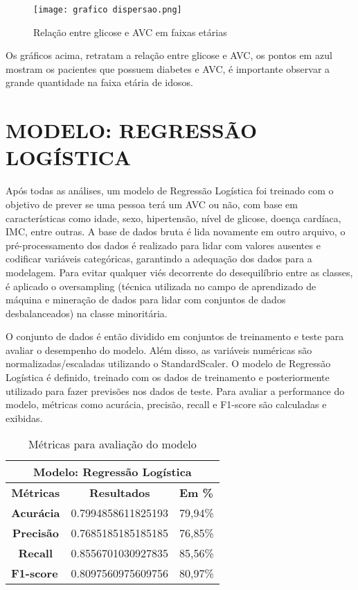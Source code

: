 \documentclass[conference]{IEEEtran}
\begin{document}
\begin{figure}[H]
   \caption{Relação entre glicose e AVC em faixas etárias}
   \centering
   \texttt{[image: grafico dispersao.png]}
\end{figure}

Os gráficos acima, retratam a relação entre glicose e AVC, os pontos em azul mostram os pacientes que possuem diabetes e AVC, é importante observar a grande quantidade na faixa etária de idosos. \\

\section*{MODELO: REGRESSÃO LOGÍSTICA}

Após todas as análises, um modelo de Regressão Logística foi treinado com o objetivo de prever se uma pessoa terá um AVC ou não, com base em características como idade, sexo, hipertensão, nível de glicose, doença cardíaca, IMC, entre outras. A base de dados bruta é lida novamente em outro arquivo, o pré-processamento dos dados é realizado para lidar com valores ausentes e codificar variáveis categóricas, garantindo a adequação dos dados para a modelagem. Para evitar qualquer viés decorrente do desequilíbrio entre as classes, é aplicado o oversampling (técnica utilizada no campo de aprendizado de máquina e mineração de dados para lidar com conjuntos de dados desbalanceados) na classe minoritária. 

O conjunto de dados é então dividido em conjuntos de treinamento e teste para avaliar o desempenho do modelo. Além disso, as variáveis numéricas são normalizadas/escaladas utilizando o StandardScaler. O modelo de Regressão Logística é definido, treinado com os dados de treinamento e posteriormente utilizado para fazer previsões nos dados de teste. Para avaliar a performance do modelo, métricas como acurácia, precisão, recall e F1-score são calculadas e exibidas. 

\begin{table}[h]
\centering
\caption{Métricas para avaliação do modelo}
\begin{tabular}{|ccl|}
\hline
\multicolumn{3}{|c|}{\textbf{Modelo: Regressão Logística}}                                          \\ \hline
\multicolumn{1}{|c|}{\textbf{Métricas}} & \multicolumn{1}{c|}{\textbf{Resultados}} & \textbf{Em \%} \\ \hline
\multicolumn{1}{|c|}{\textbf{Acurácia}} & \multicolumn{1}{c|}{0.7994858611825193}  & 79,94\%        \\ \hline
\multicolumn{1}{|c|}{\textbf{Precisão}} & \multicolumn{1}{c|}{0.7685185185185185}  & 76,85\%        \\ \hline
\multicolumn{1}{|c|}{\textbf{Recall}}   & \multicolumn{1}{c|}{0.8556701030927835}  & 85,56\%        \\ \hline
\multicolumn{1}{|l|}{\textbf{F1-score}} & \multicolumn{1}{l|}{0.8097560975609756}  & 80,97\%        \\ \hline
\end{tabular}
\end{table}
\end{document}
